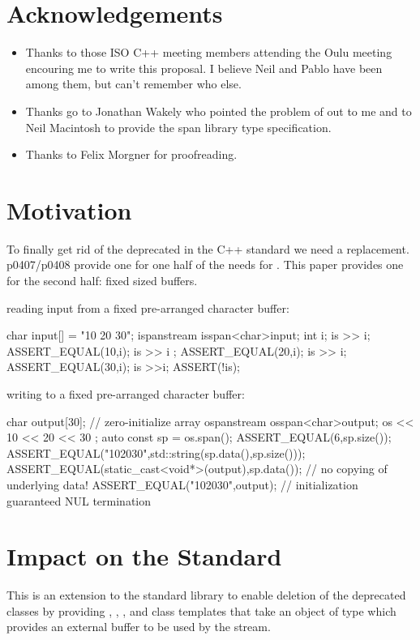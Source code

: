 \documentclass[ebook,11pt,article]{memoir}
\begin{document}
\chapter{Acknowledgements}
\begin{itemize}
\item Thanks to those ISO C++ meeting members attending the Oulu meeting encouring me to write this proposal. I believe Neil and Pablo have been among them, but can't remember who else.
\item Thanks go to Jonathan Wakely who pointed the problem of  out to me and to Neil Macintosh to provide the span library type specification.
\item Thanks to Felix Morgner for proofreading.
\end{itemize}

\chapter{Motivation}
To finally get rid of the deprecated  in the C++ standard we need a replacement. p0407/p0408 provide one for one half of the needs for . This paper provides one for the second half: fixed sized buffers. 

\begin{example} reading input from a fixed pre-arranged character buffer:
\begin{codeblock}
char input[] = "10 20 30";
ispanstream is{span<char>{input}};
int i;
is >> i;
ASSERT_EQUAL(10,i);
is >> i ;
ASSERT_EQUAL(20,i);
is >> i;
ASSERT_EQUAL(30,i);
is >>i;
ASSERT(!is);
\end{codeblock}
\end{example}
\begin{example} writing to a fixed pre-arranged character buffer:
\begin{codeblock}
char  output[30]{}; // zero-initialize array
ospanstream os{span<char>{output}};
os << 10 << 20 << 30 ;
auto const sp = os.span();
ASSERT_EQUAL(6,sp.size());
ASSERT_EQUAL("102030",std::string(sp.data(),sp.size()));
ASSERT_EQUAL(static_cast<void*>(output),sp.data()); // no copying of underlying data!
ASSERT_EQUAL("102030",output); // initialization guaranteed NUL termination
\end{codeblock}
\end{example}

\chapter{Impact on the Standard}
This is an extension to the standard library to enable deletion of the deprecated  classes by providing , , , and  class templates that take an object of type  which provides an external buffer to be used by the stream. 
\end{document}
